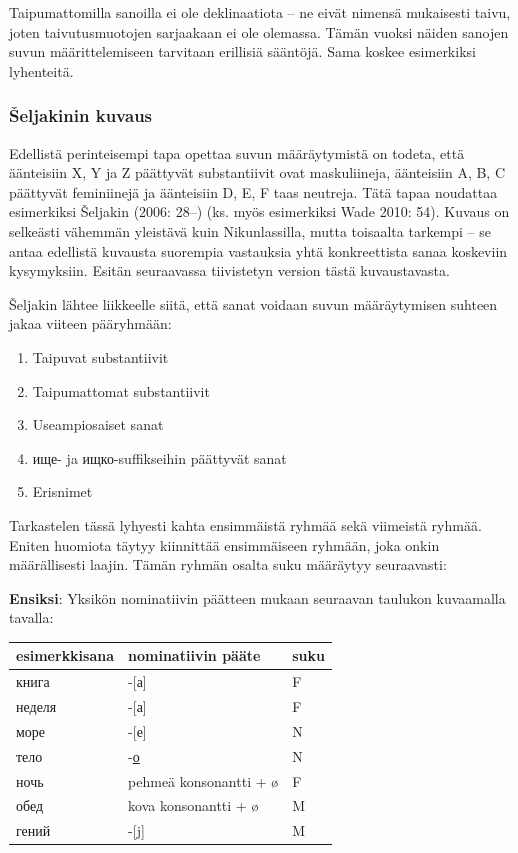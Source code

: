 \documentclass[]{scrreprt}
\providecommand{\tightlist}{%
  \setlength{\itemsep}{0pt}\setlength{\parskip}{0pt}}
\begin{document}
Taipumattomilla sanoilla ei ole deklinaatiota -- ne eivät nimensä
mukaisesti taivu, joten taivutusmuotojen sarjaakaan ei ole olemassa.
Tämän vuoksi näiden sanojen suvun määrittelemiseen tarvitaan erillisiä
sääntöjä. Sama koskee esimerkiksi lyhenteitä.

\subsubsection{Šeljakinin kuvaus}\label{ux161eljakinin-kuvaus}

Edellistä perinteisempi tapa opettaa suvun määräytymistä on todeta, että
äänteisiin X, Y ja Z päättyvät substantiivit ovat maskuliineja,
äänteisiin A, B, C päättyvät feminiinejä ja äänteisiin D, E, F taas
neutreja. Tätä tapaa noudattaa esimerkiksi Šeljakin (2006: 28--) (ks.
myös esimerkiksi Wade 2010: 54). Kuvaus on selkeästi vähemmän yleistävä
kuin Nikunlassilla, mutta toisaalta tarkempi -- se antaa edellistä
kuvausta suorempia vastauksia yhtä konkreettista sanaa koskeviin
kysymyksiin. Esitän seuraavassa tiivistetyn version tästä kuvaustavasta.

Šeljakin lähtee liikkeelle siitä, että sanat voidaan suvun määräytymisen
suhteen jakaa viiteen pääryhmään:

\begin{enumerate}
\def\labelenumi{\arabic{enumi}.}
\tightlist
\item
  Taipuvat substantiivit
\item
  Taipumattomat substantiivit
\item
  Useampiosaiset sanat
\item
  ище- ja ищко-suffikseihin päättyvät sanat
\item
  Erisnimet
\end{enumerate}

Tarkastelen tässä lyhyesti kahta ensimmäistä ryhmää sekä viimeistä
ryhmää. Eniten huomiota täytyy kiinnittää ensimmäiseen ryhmään, joka
onkin määrällisesti laajin. Tämän ryhmän osalta suku määräytyy
seuraavasti:

\textbf{Ensiksi}: Yksikön nominatiivin päätteen mukaan seuraavan
taulukon kuvaamalla tavalla:

\begin{longtable}[c]{@{}lll@{}}
\toprule
esimerkkisana & nominatiivin pääte & suku\tabularnewline
\midrule
\endhead
книга & -{[}а{]} & F\tabularnewline
неделя & -{[}а{]} & F\tabularnewline
море & -{[}е{]} & N\tabularnewline
тело & -\hyperref[ux43e]{о} & N\tabularnewline
ночь & pehmeä konsonantti + ø & F\tabularnewline
обед & kova konsonantti + ø & M\tabularnewline
гений & -{[}j{]} & M\tabularnewline
\bottomrule
\end{longtable}
\end{document}
